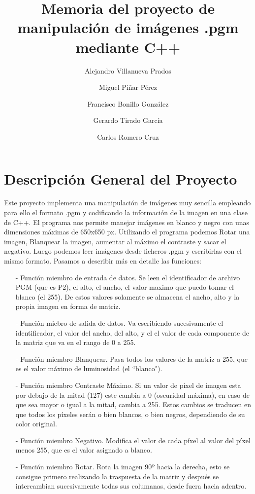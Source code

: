 \documentclass[a4paper, 11pt, spanish]{article}
\title{Memoria del proyecto de manipulación de imágenes .pgm mediante C++}
\author{Alejandro Villanueva Prados \and Miguel Piñar Pérez \and Francisco Bonillo González \and Gerardo Tirado García \and Carlos Romero Cruz}
\date{}
\begin{document}
\maketitle

\tableofcontents

\section{Descripción General del Proyecto}

Este proyecto implementa una manipulación de imágenes muy sencilla empleando para ello el formato .pgm y codificando la información de la imagen en una clase de C++. El programa nos permite manejar imágenes en blanco y negro con unas dimensiones máximas de 650x650 px. Utilizando el programa podemos Rotar una imagen, Blanquear la imagen, aumentar al máximo el contraste y sacar el negativo. Luego podemos leer imágenes desde ficheros .pgm y escribirlas con el mismo formato. Pasamos a describir más en detalle las funciones:

\begin{itemize}
\item[-] Función miembro de entrada de datos. Se leen el identificador de archivo PGM (que es P2), el alto, el ancho, el valor maximo que puedo tomar el blanco (el 255). De estos valores solamente se almacena el ancho, alto y la propia imagen en forma de matriz.

\item[-] Función miebro de salida de datos. Va escribiendo sucesivamente el identificador, el valor del ancho, del alto, y el el valor de cada componente de la matriz que va en el rango de 0 a 255.

\item[-] Función miembro Blanquear. Pasa todos los valores de la matriz a 255, que es el valor máximo de luminosidad (el ``blanco").

\item[-] Función miembro Contraste Máximo. Si un valor de pixel de imagen esta por debajo de la mitad (127) este cambia a 0 (oscuridad máxima), en caso de que sea mayor o igual a la mitad, cambia a 255. Estos cambios se traducen en que todos los píxeles serán o bien blancos, o bien negros, dependiendo de su color original.

\item[-] Función miembro Negativo. Modifica el valor de cada píxel al valor del píxel menos 255, que es el valor asignado a blanco.

\item[-] Función miembro Rotar. Rota la imagen 90º hacia la derecha, esto se consigue primero realizando la traspuesta de la matriz y después se intercambian sucesivamente todas sus columanas, desde fuera hacia adentro. 

\end{itemize}
\end{document}
